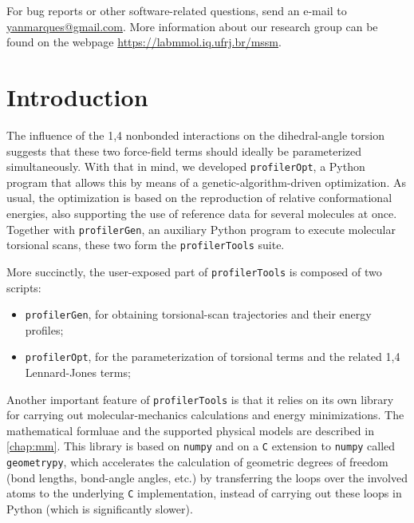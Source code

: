 \documentclass[10pt,a4paper,openany]{memoir}
\numberwithin{equation}{section}
\newcommand{\revyan}[1]{{\color{red}{[#1]}}}
\newcommand{\profileropt}[0]{\texttt{profilerOpt}}
\newcommand{\profilergen}[0]{\texttt{profilerGen}}
\newcommand{\profilertools}[0]{\texttt{profilerTools}}
\begin{document}
  For bug reports or other software-related questions, send an e-mail
  to \url{yanmarques@gmail.com}.  More information about our research
  group can be found on the webpage
  \url{https://labmmol.iq.ufrj.br/mssm}.

\tableofcontents

  \mainmatter

\newcommand*{\profi}{\texttt{profilerOpt}}

\chapter{Introduction}
\label{chap:intro}

\revyan{Importance of torsions, some literature--this will wait for the paper.}

The influence of the 1,4 nonbonded interactions on the dihedral-angle
torsion suggests that these two force-field terms should ideally be
parameterized simultaneously.
%
With that in mind, we developed \profileropt{}, a Python program that
allows this by means of a genetic-algorithm-driven optimization.
%
As usual, the optimization is based on the reproduction of relative
conformational energies, also supporting the use of reference data for
several molecules at once.
%
Together with \profilergen{}, an auxiliary Python program to execute
molecular torsional scans, these two form the \profilertools{} suite.
%

More succinctly, the user-exposed part of \profilertools{} is composed
of two scripts:

\begin{itemize}
\item \profilergen, for obtaining torsional-scan trajectories and
  their energy profiles;
\item \profileropt, for the parameterization of torsional terms and
  the related 1,4 Lennard-Jones terms;
\end{itemize}

Another important feature of \profilertools{} is that it relies on its
own library for carrying out molecular-mechanics calculations and
energy minimizations. The mathematical formluae and the supported
physical models are described in \autoref{chap:mm}. This library is
based on \texttt{numpy} and on a \texttt{C} extension to
\texttt{numpy} called \texttt{geometrypy}, which accelerates the
calculation of geometric degrees of freedom (bond lengths, bond-angle
angles, etc.) by transferring the loops over the involved atoms to the
underlying \texttt{C} implementation, instead of carrying out these
loops in Python (which is significantly slower).
\end{document}
